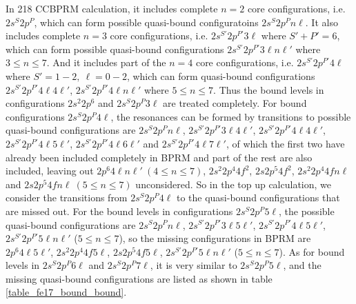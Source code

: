 In  218 CCBPRM calculation, it includes complete $n=2$ core configurations, i.e. $2s^S 2p^P$, which can form possible quasi-bound configuratoins $2s^S 2p^P n\ell$. It also includes complete $n=3$ core configurations, i.e. $2s^{S'} 2p^{P'} 3\ell$ where $S'+P' = 6$, which can form possible quasi-bound configurations $2s^{S'} 2p^{P'} 3\ell n\ell'$ where $3 \leq n \leq 7$. And it includes part of the $n=4$ core configurations, i.e.  $2s^{S'} 2p^{P'} 4\ell$ where $S' = 1-2, ~\ell = 0-2$, which can form quasi-bound configurations $2s^{S'} 2p^{P'} 4\ell 4\ell'$, $2s^{S'} 2p^{P'} 4\ell n\ell'$ where $5 \leq n \leq 7$. Thus the bound levels in configurations $2s^2 2p^6$ and $2s^S 2p^P 3\ell$ are treated completely. For bound configurations $2s^S 2p^P 4\ell$, the resonances can be formed by transitions to possible quasi-bound configurations are $2s^S 2p^P n\ell$, $2s^{S'} 2p^{P'} 3\ell 4\ell'$, $2s^{S'} 2p^{P'} 4\ell 4\ell'$, $2s^{S'} 2p^{P'} 4\ell 5\ell'$, $2s^{S'} 2p^{P'} 4\ell 6\ell'$ and $2s^{S'} 2p^{P'} 4\ell 7\ell'$, of which the first two have already been included completely in BPRM and part of the rest are also included, leaving out $2p^6 4\ell n\ell'~(4 \leq n \leq 7)$, $2s^2 2p^4 4f^2$, $2s 2p^5 4f^2$, $2s^2 2p^4 4f n\ell$ and  $2s 2p^5 4f n\ell~(5 \leq n \leq 7)$ unconsidered. So in the top up calculation, we consider the transitions from  $2s^S 2p^P 4\ell$ to the quasi-bound configurations that are missed out. For the bound levels in configurations  $2s^S 2p^P 5\ell$, the possible quasi-bound configurations are  $2s^S 2p^P n\ell$,  $2s^{S'} 2p^{P'} 3\ell 5\ell'$, $2s^{S'} 2p^{P'} 4\ell 5\ell'$,  $2s^{S'} 2p^{P'} 5\ell n\ell'$ ($5 \leq n \leq 7$), so the missing configurations in BPRM are $2p^6 4\ell 5\ell'$, $2s^2 2p^4 4f 5\ell$, $2s 2p^5 4f 5\ell$, $2s^{S'} 2p^{P'} 5\ell n\ell'$ ($5 \leq n \leq 7$). As for bound levels in $2s^S 2p^P 6\ell$ and $2s^S 2p^P 7\ell$, it is very similar to $2s^S 2p^P 5\ell$, and the missing quasi-bound configurations are listed as shown in table \ref{table_fe17_bound_bound}.

